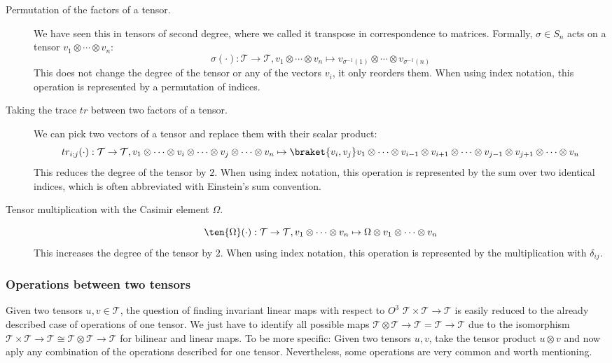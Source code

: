 {\begin{description}
	\item[Permutation of the factors of a tensor.] We have seen this in tensors of second degree, where we called it transpose in correspondence to matrices. Formally, $\sigma \in S_n$ acts on a tensor $v_1 \otimes \cdots \otimes v_n$:
	\[\sigma(\cdot): \mathcal{T}\to \mathcal{T}, v_1 \otimes \cdots \otimes v_n \mapsto v_{\sigma^{-1}(1)} \otimes \cdots \otimes v_{\sigma^{-1}(n)}\]
	This does not change the degree of the tensor or any of the vectors $v_i$, it only reorders them. When using index notation, this operation is represented by a permutation of indices.
	
	\item[Taking the trace $tr$ between two factors of a tensor.] We can pick two vectors of a tensor and replace them with their scalar product:
	\[tr_{i;j} (\cdot): \mathcal{T} \to \mathcal{T}, v_1 \otimes \cdots \otimes v_i \otimes \cdots \otimes v_j \otimes \cdots \otimes v_n \mapsto \braket{v_i,v_j} v_1 \otimes \cdots \otimes v_{i-1}\otimes v_{i+1} \otimes \cdots \otimes v_{j-1} \otimes v_{j+1} \otimes \cdots \otimes v_n\]
	This reduces the degree of the tensor by $2$. When using index notation, this operation is represented by the sum over two identical indices, which is often abbreviated with Einstein's sum convention.
	
	\item[Tensor multiplication with the Casimir element $\Omega$.]
	\[\ten{\Omega} (\cdot):  \mathcal{T}\to \mathcal{T}, v_1 \otimes \cdots \otimes v_n \mapsto \Omega \otimes v_{1} \otimes \cdots \otimes v_{n} \]
	This increases the degree of the tensor by $2$. When using index notation, this operation is represented by the multiplication with $\delta_{ij}$.
\end{description}

\subsubsection{Operations between two tensors}
Given two tensors $u,v \in \mathcal{T}$, the question of finding invariant linear maps with respect to $O^3$ $\mathcal{T} \times \mathcal{T} \to \mathcal{T}$ is easily reduced to the already described case of operations of one tensor. We just have to identify all possible maps $\mathcal{T} \otimes \mathcal{T} \to \mathcal{T} = \mathcal{T} \to \mathcal{T}$ due to the isomorphism $\mathcal{T} \times \mathcal{T} \to \mathcal{T} \cong \mathcal{T} \otimes \mathcal{T} \to \mathcal{T}$ for bilinear and linear maps. To be more specific: Given two tensors $u,v$, take the tensor product $u\otimes v$ and now aply any combination of the operations described for one tensor. Nevertheless, some operations are very common and worth mentioning.

}
